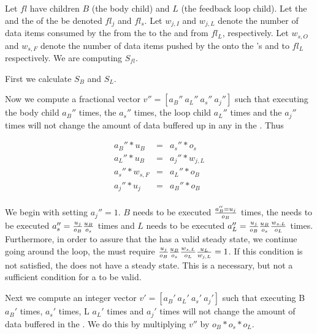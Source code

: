 Let {\feedbackloop} $fl$ have children $B$ (the body child) and
$L$ (the feedback loop child). Let the {\joiner} and the
{\splitter} of the {\feedbackloop} be denoted $fl_j$ and $fl_s$.
Let $w_{j,I}$ and $w_{j,L}$ denote the number of data items
consumed by the {\joiner} from the {\Input} {{\Channel}} to the
{\feedbackloop} and from $fl_L$, respectively.  Let $w_{s,O}$ and
$w_{s,F}$ denote the number of data items pushed by the
{\splitter} onto the {\feedbackloop}'s {\Input} {{\Channel}} and
to $fl_L$ respectively.  We are computing $S_{fl}$.

First we calculate $S_{B}$ and $S_{L}$.

Now we compute a fractional vector $v'' = [a_B''\ a_L''\ a_s''\
a_j'']$ such that executing the body child $a_B''$ times, the
{\splitter} $a_s''$ times, the loop child $a_L''$ times and the
{\joiner} $a_j''$ times will not change the amount of data
buffered up in any \Channel in the {\feedbackloop}.  Thus

\begin{displaymath}
\begin{array}{rcl}
a_B'' * u_B & = & a_s'' * o_s \\
a_L'' * u_B & = & a_j'' * w_{j, L} \\
a_s'' * w_{s, F} & = & a_L'' * o_B \\
a_j'' * u_j & = & a_B'' * o_B \\
\end{array}
\end{displaymath}

We begin with setting $a_j'' = 1$. $B$ needs to be executed $a_B''
= u_j \over o_B$ times, the {\splitter} needs to be executed
$a_s'' = {u_j \over o_B}{u_B \over o_s}$ times and $L$ needs to be
executed $a_L'' = {u_j \over o_B}{u_B \over o_s}{w_{s,L} \over
o_L}$ times. Furthermore, in order to assure that the
{\feedbackloop} has a valid steady state, we continue going around
the loop, the {\joiner} must require ${u_j \over o_B}{u_B \over
o_s}{w_{s,L} \over o_L}{u_L \over w_{j,L}} = 1$.  If this
condition is not satisfied, the {\feedbackloop} does not have a
steady state. This is a necessary, but not a sufficient condition
for a {\feedbackloop} to be valid.

Next we compute an integer vector $v' = [a_B'\ a_L'\ a_s'\ a_j']$
such that executing B $a_B'$ times, {\splitter} $a_s'$ times, L
$a_L'$ times and {\joiner} $a_j'$ times will not change the amount
of data buffered in the {\splitjoin}. We do this by multiplying
$v''$ by $o_B * o_s * o_L$.

